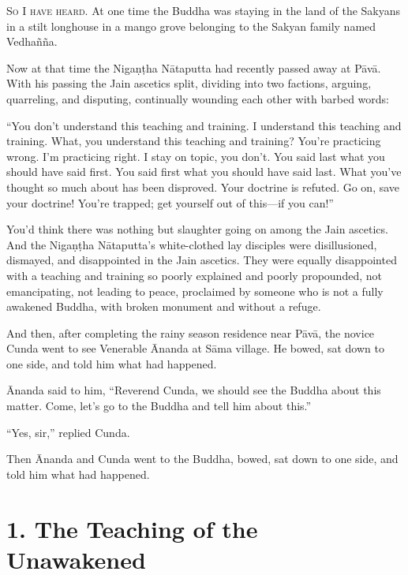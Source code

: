 \documentclass[12pt,openany]{book}%
\newcommand*{\scevam}[1]{\textsc{#1}}
\begin{document}
\scevam{So I have heard. }At one time the Buddha was staying in the land of the Sakyans in a stilt longhouse in a mango grove belonging to the Sakyan family named \textsanskrit{Vedhañña}. 

Now at that time the \textsanskrit{Nigaṇṭha} \textsanskrit{Nātaputta} had recently passed away at \textsanskrit{Pāvā}. With his passing the Jain ascetics split, dividing into two factions, arguing, quarreling, and disputing, continually wounding each other with barbed words: 

“You don’t understand this teaching and training. I understand this teaching and training. What, you understand this teaching and training? You’re practicing wrong. I’m practicing right. I stay on topic, you don’t. You said last what you should have said first. You said first what you should have said last. What you’ve thought so much about has been disproved. Your doctrine is refuted. Go on, save your doctrine! You’re trapped; get yourself out of this—if you can!” 

You’d think there was nothing but slaughter going on among the Jain ascetics. And the \textsanskrit{Nigaṇṭha} \textsanskrit{Nātaputta}’s white-clothed lay disciples were disillusioned, dismayed, and disappointed in the Jain ascetics. They were equally disappointed with a teaching and training so poorly explained and poorly propounded, not emancipating, not leading to peace, proclaimed by someone who is not a fully awakened Buddha, with broken monument and without a refuge. 

And then, after completing the rainy season residence near \textsanskrit{Pāvā}, the novice Cunda went to see Venerable Ānanda at \textsanskrit{Sāma} village. He bowed, sat down to one side, and told him what had happened. 

Ānanda said to him, “Reverend Cunda, we should see the Buddha about this matter. Come, let’s go to the Buddha and tell him about this.” 

“Yes, sir,” replied Cunda. 

Then Ānanda and Cunda went to the Buddha, bowed, sat down to one side, and told him what had happened. 

\section*{1. The Teaching of the Unawakened }
\end{document}
